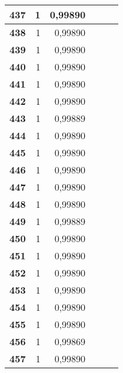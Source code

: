 \begin{longtable}{|r|r|r|l|r|r|}
\textbf{437} & 1 & 0,99890 &  & \multicolumn{1}{l|}{} & \multicolumn{1}{l|}{} \\ \hline
\textbf{438} & 1 & 0,99890 &  & \multicolumn{1}{l|}{} & \multicolumn{1}{l|}{} \\ \hline
\textbf{439} & 1 & 0,99890 &  & \multicolumn{1}{l|}{} & \multicolumn{1}{l|}{} \\ \hline
\textbf{440} & 1 & 0,99890 &  & \multicolumn{1}{l|}{} & \multicolumn{1}{l|}{} \\ \hline
\textbf{441} & 1 & 0,99890 &  & \multicolumn{1}{l|}{} & \multicolumn{1}{l|}{} \\ \hline
\textbf{442} & 1 & 0,99890 &  & \multicolumn{1}{l|}{} & \multicolumn{1}{l|}{} \\ \hline
\textbf{443} & 1 & 0,99889 &  & \multicolumn{1}{l|}{} & \multicolumn{1}{l|}{} \\ \hline
\textbf{444} & 1 & 0,99890 &  & \multicolumn{1}{l|}{} & \multicolumn{1}{l|}{} \\ \hline
\textbf{445} & 1 & 0,99890 &  & \multicolumn{1}{l|}{} & \multicolumn{1}{l|}{} \\ \hline
\textbf{446} & 1 & 0,99890 &  & \multicolumn{1}{l|}{} & \multicolumn{1}{l|}{} \\ \hline
\textbf{447} & 1 & 0,99890 &  & \multicolumn{1}{l|}{} & \multicolumn{1}{l|}{} \\ \hline
\textbf{448} & 1 & 0,99890 &  & \multicolumn{1}{l|}{} & \multicolumn{1}{l|}{} \\ \hline
\textbf{449} & 1 & 0,99889 &  & \multicolumn{1}{l|}{} & \multicolumn{1}{l|}{} \\ \hline
\textbf{450} & 1 & 0,99890 &  & \multicolumn{1}{l|}{} & \multicolumn{1}{l|}{} \\ \hline
\textbf{451} & 1 & 0,99890 &  & \multicolumn{1}{l|}{} & \multicolumn{1}{l|}{} \\ \hline
\textbf{452} & 1 & 0,99890 &  & \multicolumn{1}{l|}{} & \multicolumn{1}{l|}{} \\ \hline
\textbf{453} & 1 & 0,99890 &  & \multicolumn{1}{l|}{} & \multicolumn{1}{l|}{} \\ \hline
\textbf{454} & 1 & 0,99890 &  & \multicolumn{1}{l|}{} & \multicolumn{1}{l|}{} \\ \hline
\textbf{455} & 1 & 0,99890 &  & \multicolumn{1}{l|}{} & \multicolumn{1}{l|}{} \\ \hline
\textbf{456} & 1 & 0,99869 &  & \multicolumn{1}{l|}{} & \multicolumn{1}{l|}{} \\ \hline
\textbf{457} & 1 & 0,99890 &  & \multicolumn{1}{l|}{} & \multicolumn{1}{l|}{} \\ \hline

\end{longtable}
